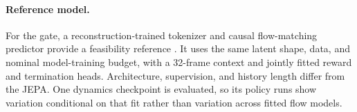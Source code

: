 \paragraph{Reference model.}
For the gate, a reconstruction-trained tokenizer and causal flow-matching predictor provide a
feasibility reference \citep{lipman2023flowmatching,chen2024diffusionforcing,hafner2025dreamer4}.
It uses the same latent shape, data, and nominal model-training budget, with a 32-frame context and
jointly fitted reward and termination heads. Architecture, supervision, and history length differ
from the JEPA. One dynamics checkpoint is evaluated, so its policy runs show variation conditional
on that fit rather than variation across fitted flow models.
